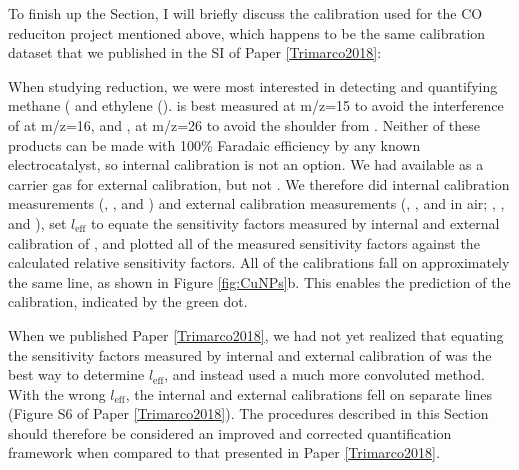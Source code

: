 To finish up the Section, I will briefly discuss the calibration used for the CO reduciton project mentioned above, which happens to be the same calibration dataset that we published in the SI of Paper \ref{Trimarco2018}:

When studying  reduction, we were most interested in detecting and quantifying methane ( and ethylene ().  is best measured at m/z=15 to avoid the interference of  at m/z=16, and , at m/z=26 to avoid the shoulder from . Neither of these products can be made with 100\% Faradaic efficiency by any known electrocatalyst\cite{Hori2008, Qiao2014a}, so internal calibration is not an option. We had  available as a carrier gas for external calibration, but not . We therefore did internal calibration measurements (, , and ) and external calibration measurements (, , and  in air; , , and ), set $l_\text{eff}$ to equate the sensitivity factors measured by internal and external calibration of , and plotted all of the measured sensitivity factors against the calculated relative sensitivity factors. All of the calibrations fall on approximately the same line, as shown in Figure \ref{fig:CuNPs}b. This enables the prediction of the  calibration, indicated by the green dot.

When we published Paper \ref{Trimarco2018}, we had not yet realized that equating the sensitivity factors measured by internal and external calibration of  was the best way to determine $l_\text{eff}$, and instead used a much more convoluted method. With the wrong $l_\text{eff}$, the internal and external calibrations fell on separate lines (Figure S6 of Paper \ref{Trimarco2018}). The procedures described in this Section should therefore be considered an improved and corrected quantification framework when compared to that presented in Paper \ref{Trimarco2018}.


